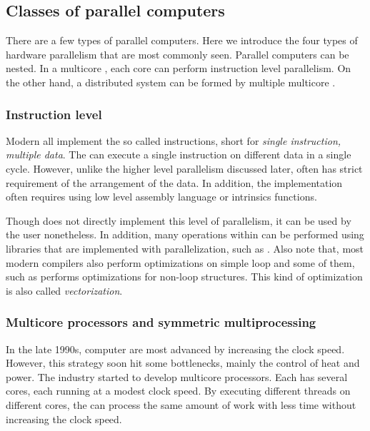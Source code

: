 \subsection{Classes of parallel computers}
\label{sub:Classes of parallel computers}

There are a few types of parallel computers. Here we introduce the four types
of hardware parallelism that are most commonly seen. Parallel computers can be
nested. In a multicore \cpu, each core can perform instruction level
parallelism. On the other hand, a distributed system can be formed by multiple
multicore \cpu.

\subsubsection{Instruction level}
\label{ssub:Instruction level}

Modern \cpu all implement the so called \simd instructions, short for
\emph{single instruction, multiple data}. The \cpu can execute a single
instruction on different data in a single cycle. However, unlike the higher
level parallelism discussed later, \simd often has strict requirement of the
arrangement of the data. In addition, the implementation often requires using
low level assembly language or intrinsics functions.

Though \vsmc does not directly implement this level of parallelism, it can be
used by the user nonetheless. In addition, many operations within \vsmc can be
performed using libraries that are implemented with \simd parallelization,
such as \mkl. Also note that, most modern \cpp compilers also perform \simd
optimizations on simple loop and some of them, such as \clang performs \simd
optimizations for non-loop structures. This kind of optimization is also
called \emph{vectorization}.

\subsubsection{Multicore processors and symmetric multiprocessing}
\label{ssub:Multicore processors and symmetric multiprocessing}

In the late 1990s, computer \cpu are most advanced by increasing the clock
speed. However, this strategy soon hit some bottlenecks, mainly the control of
heat and power. The industry started to develop multicore processors. Each
\cpu has several cores, each running at a modest clock speed. By executing
different threads on different cores, the \cpu can process the same amount of
work with less time without increasing the clock speed.


